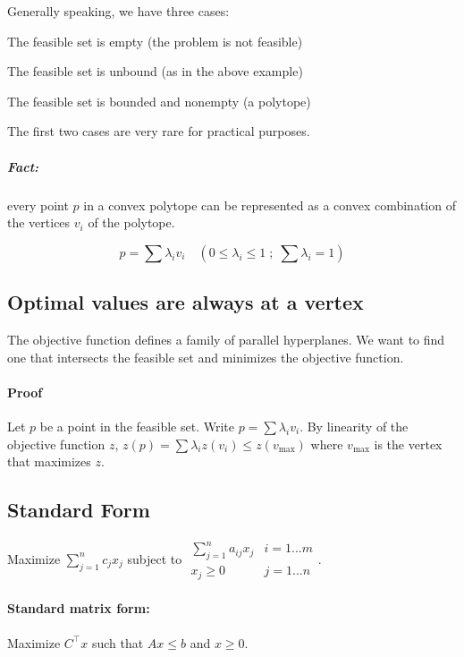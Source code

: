 \documentclass[a4paper]{article}
\newenvironment{enumerate*}%
  {\begin{enumerate}%
    \setlength{\itemsep}{0.5pt}%
    \setlength{\parsep}{0pt}%
    \setlength{\parskip}{0pt}}%
  {\end{enumerate}}
\begin{document}
Generally speaking, we have three cases:

\begin{enumerate*}
  \item The feasible set is empty (the problem is not feasible)
  \item The feasible set is unbound (as in the above example)
  \item The feasible set is bounded and nonempty (a polytope)
\end{enumerate*}

The first two cases are very rare for practical purposes.

\subparagraph{Fact:}
every point $p$ in a convex polytope can be represented as a convex combination of the vertices $v_i$ of the polytope.

\[p=\sum \lambda_i v_i \quad (0 \le \lambda_i \le 1 \;;\; \sum \lambda_i = 1)\]

\subsection{Optimal values are always at a vertex}

The objective function defines a family of parallel hyperplanes.
We want to find one that intersects the feasible set and minimizes the objective function.

\paragraph{Proof}
Let $p$ be a point in the feasible set.
Write $p=\sum \lambda_i v_i$.
By linearity of the objective function $z$, $z(p)=\sum \lambda_i z(v_i) \le z(v_{\max})$ where $v_{\max}$ is the vertex that maximizes $z$.

\subsection{Standard Form}
Maximize $\sum\limits_{j=1}^n c_j x_j$ subject to $\begin{matrix}\sum_{j=1}^n a_{ij} x_j & i=1 ... m \\ x_j\ge 0 & j = 1 ... n\end{matrix}$.

\paragraph{Standard matrix form:}
Maximize $C^\intercal x$ such that $Ax \le b$ and $x \ge 0$.
\end{document}
